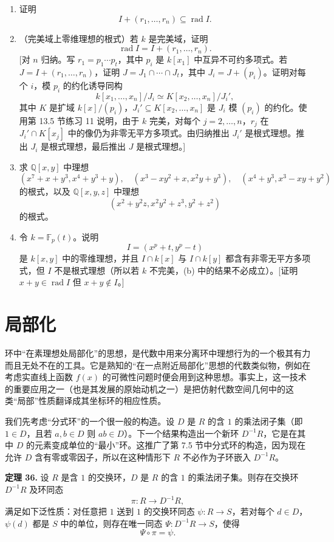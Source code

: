 \begin{enumerate}[label=\arabic*.]
\begin{enumerate}[label=(\alph*)]
		\item 证明
		\[
		I+(r_1,
		\ldots,r_n)\subseteq\operatorname{rad}I.
		\]
		\item （完美域上零维理想的根式）若 $k$ 是完美域，证明
		\[
		\operatorname{rad}I=I+(r_1,
		\ldots,r_n).
		\]
		[对 $n$ 归纳。写 $r_1=p_1\cdots p_t$，其中 $p_i$ 是 $k[x_1]$ 中互异不可约多项式。若 $J=I+(r_1,
		\ldots,r_n)$，证明 $J=J_1\cap\cdots\cap J_t$，其中 $J_i=J+(p_i)$。证明对每个 $i$，模 $p_i$ 的约化诱导同构
		\[
		k[x_1,
		\ldots,x_n]/J_i\simeq K[x_2,
		\ldots,x_n]/J_i',
		\]
		其中 $K$ 是扩域 $k[x]/(p_i)$，$J_i'\subseteq K[x_2,
		\ldots,x_n]$ 是 $J_i$ 模 $(p_i)$ 的约化。使用第 13.5 节练习 11 说明，由于 $k$ 完美，对每个 $j=2,
		\ldots,n$，$r_j$ 在 $J_i'\cap K[x_j]$ 中的像仍为非零无平方多项式。由归纳推出 $J_i'$ 是根式理想。推出 $J_i$ 是根式理想，最后推出 $J$ 是根式理想。]
		\item 求 $\mathbb Q[x,y]$ 中理想
		\[
		(x^7+x+y^3,
		x^4+y^3+y),
		\quad
		(x^3-xy^2+x,
		x^2y+y^3),
		\quad
		(x^4+y^3,
		x^3-xy+y^2)
		\]
		的根式，以及 $\mathbb Q[x,y,z]$ 中理想
		\[
		(x^2+y^2z,
		x^2y^2+z^3,
		y^2+z^2)
		\]
		的根式。
		\item 令 $k=\mathbb F_p(t)$。说明
		\[
		I=(x^p+t,
		y^p-t)
		\]
		是 $k[x,y]$ 中的零维理想，并且 $I\cap k[x]$ 与 $I\cap k[y]$ 都含有非零无平方多项式，但 $I$ 不是根式理想（所以若 $k$ 不完美，(b) 中的结果不必成立）。[证明 $x+y\in\operatorname{rad}I$ 但 $x+y\notin I$。]
	\end{enumerate}
\end{enumerate}
\section{局部化}

环中“在素理想处局部化”的思想，是代数中用来分离环中理想行为的一个极其有力而且无处不在的工具。它是熟知的“在一点附近局部化”思想的代数类似物，例如在考虑实直线上函数 $f(x)$ 的可微性问题时便会用到这种思想。事实上，这一技术的重要应用之一（也是其发展的原始动机之一）是把仿射代数空间几何中的这类“局部”性质翻译成其坐标环的相应性质。

我们先考虑“分式环”的一个很一般的构造。设 $D$ 是 $R$ 的含 $1$ 的乘法闭子集（即 $1\in D$，且若 $a,b\in D$ 则 $ab\in D$）。下一个结果构造出一个新环 $D^{-1}R$，它是在其中 $D$ 的元素变成单位的“最小”环。这推广了第 7.5 节中分式环的构造，因为现在允许 $D$ 含有零或零因子，所以在这种情形下 $R$ 不必作为子环嵌入 $D^{-1}R$。

\noindent\textbf{定理 36.} 设 $R$ 是含 $1$ 的交换环，$D$ 是 $R$ 的含 $1$ 的乘法闭子集。则存在交换环 $D^{-1}R$ 及环同态
\[
\pi:R\longrightarrow D^{-1}R,
\]
满足如下泛性质：对任意把 $1$ 送到 $1$ 的交换环同态 $\psi:R\to S$，若对每个 $d\in D$，$\psi(d)$ 都是 $S$ 中的单位，则存在唯一同态 $\Psi:D^{-1}R\to S$，使得
\[
\Psi\circ\pi=\psi.
\]

